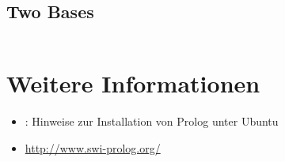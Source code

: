 \inputminted[numbersep=5pt, tabsize=4]{prolog}{scripts/prolog/regex.pl}

\subsection{Two Bases}

\inputminted[numbersep=5pt, tabsize=4]{prolog}{scripts/prolog/01-two-bases.prolog}

\section{Weitere Informationen}
\begin{itemize}
    \item \href{http://wiki.ubuntuusers.de/Prolog}{}: Hinweise zur Installation von Prolog unter Ubuntu
    \item \url{http://www.swi-prolog.org/}
\end{itemize}
